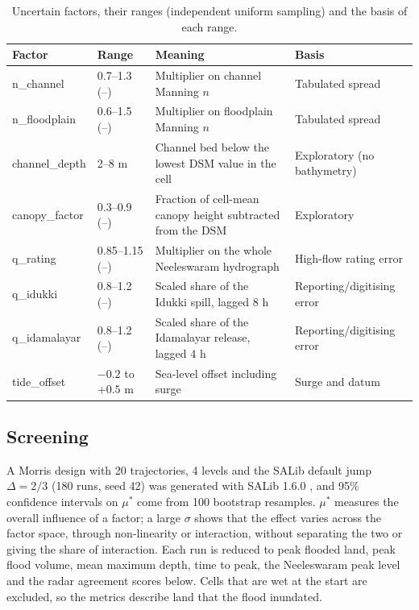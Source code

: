 \documentclass[preprint,12pt,authoryear]{elsarticle}
\begin{document}
\begin{table}[htbp]
\centering
\caption{Uncertain factors, their ranges (independent uniform sampling) and the basis of each range.}
\label{tab:factors}
\small
\begin{tabularx}{\textwidth}{@{}lp{2.4cm}>{\raggedright\arraybackslash}X>{\raggedright\arraybackslash}p{3.2cm}@{}}
\toprule
Factor & Range & Meaning & Basis \\
\midrule
n\_channel & 0.7--1.3 (--) & Multiplier on channel Manning $n$ & Tabulated spread \\
n\_floodplain & 0.6--1.5 (--) & Multiplier on floodplain Manning $n$ & Tabulated spread \\
channel\_depth & 2--8 m & Channel bed below the lowest DSM value in the cell & Exploratory (no bathymetry) \\
canopy\_factor & 0.3--0.9 (--) & Fraction of cell-mean canopy height subtracted from the DSM & Exploratory \\
q\_rating & 0.85--1.15 (--) & Multiplier on the whole Neeleswaram hydrograph & High-flow rating error \\
q\_idukki & 0.8--1.2 (--) & Scaled share of the Idukki spill, lagged 8 h & Reporting/digitising error \\
q\_idamalayar & 0.8--1.2 (--) & Scaled share of the Idamalayar release, lagged 4 h & Reporting/digitising error \\
tide\_offset & $-0.2$ to $+0.5$ m & Sea-level offset including surge & Surge and datum \\
\bottomrule
\end{tabularx}
\end{table}

\subsection{Screening}
A Morris design with 20 trajectories, 4 levels and the SALib default jump $\Delta = 2/3$ (180 runs, seed 42) was generated with SALib 1.6.0 \citep{herman2017}, and 95\% confidence intervals on $\mu^*$ come from 100 bootstrap resamples. $\mu^*$ measures the overall influence of a factor; a large $\sigma$ shows that the effect varies across the factor space, through non-linearity or interaction, without separating the two or giving the share of interaction. Each run is reduced to peak flooded land, peak flood volume, mean maximum depth, time to peak, the Neeleswaram peak level and the radar agreement scores below. Cells that are wet at the start are excluded, so the metrics describe land that the flood inundated.
\end{document}
